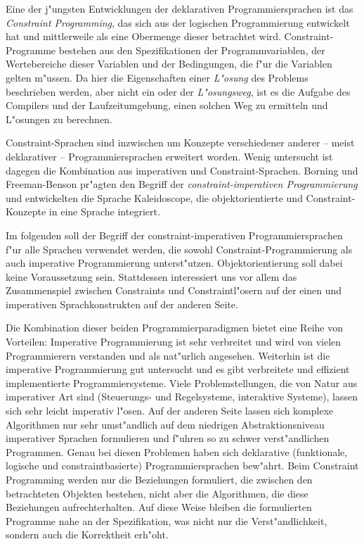 Eine der j"ungsten Entwicklungen der deklarativen Programmiersprachen
ist das {\em Constraint Programming}, das sich aus der logischen
Programmierung entwickelt hat und mittlerweile als eine Obermenge
dieser betrachtet wird.  Constraint-Programme bestehen aus den
Spezifikationen der Programmvariablen, der Wertebereiche dieser
Variablen und der Bedingungen, die f"ur die Variablen gelten m"ussen.
Da hier die Eigenschaften einer {\em L"osung} des Problems beschrieben
werden, aber nicht ein oder der {\em L"osungsweg}, ist es die Aufgabe
des Compilers und der Laufzeitumgebung, einen solchen Weg zu ermitteln
und L"osungen zu berechnen.

Constraint-Sprachen sind inzwischen um Konzepte verschiedener anderer 
-- meist deklarativer -- Programmiersprachen erweitert worden.
%
Wenig untersucht ist dagegen die Kombination aus imperativen und
Constraint-Sprachen.  Borning und Freeman-Benson
\cite{benson92int,benson91cip} pr"agten den Begriff der {\em
  constraint-imperativen Programmierung} \cite{CIP1,CIP2} und
entwickelten die Sprache Kaleidoscope, die objektorientierte und
Constraint-Konzepte in eine Sprache integriert.

Im folgenden soll der Begriff der constraint-imperativen
Programmiersprachen f"ur alle Sprachen verwendet werden, die sowohl
Constraint-Programmierung als auch imperative Programmierung
unterst"utzen.  Objektorientierung soll dabei keine Voraussetzung
sein.  Stattdessen interessiert uns vor allem das Zusammenspiel
zwischen Constraints und Constraintl"osern auf der einen und
imperativen Sprachkonstrukten auf der anderen Seite.

Die Kombination dieser beiden Programmierparadigmen bietet eine Reihe
von Vorteilen: Imperative Programmierung ist sehr verbreitet und wird
von vielen Programmierern verstanden und als nat"urlich angesehen.
Weiterhin ist die imperative Programmierung gut untersucht und es gibt
verbreitete und effizient implementierte Programmiersysteme.  
%
Viele Problemstellungen, die von Natur aus imperativer Art sind
(Steuerungs- und Regelsysteme, interaktive Systeme), lassen sich sehr
leicht imperativ l"osen.  
%
Auf der anderen Seite lassen sich komplexe Algorithmen nur sehr
umst"andlich auf dem niedrigen Abstraktionsniveau imperativer Sprachen
formulieren und f"uhren so zu schwer verst"andlichen Programmen.
Genau bei diesen Problemen haben sich deklarative (funktionale,
logische und constraintbasierte) Programmiersprachen bew"ahrt.  Beim
Constraint Programming werden nur die Beziehungen formuliert, die
zwischen den betrachteten Objekten bestehen, nicht aber die
Algorithmen, die diese Beziehungen aufrechterhalten.  Auf diese Weise
bleiben die formulierten Programme nahe an der Spezifikation, was
nicht nur die Verst"andlichkeit, sondern auch die Korrektheit
erh"oht.

